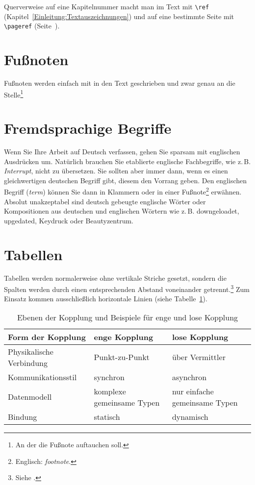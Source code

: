 Querverweise auf eine Kapitelnummer macht man im Text mit \verb+\ref+ (Kapitel~\ref{Einleitung:Textauszeichnungen}) und auf eine bestimmte Seite mit \verb+\pageref+ (Seite~\pageref{Einleitung:Textauszeichnungen}).


\section{Fußnoten}

Fußnoten werden einfach mit in den Text geschrieben und zwar genau an die Stelle\footnote{An der die Fußnote auftauchen soll.}



\section{Fremdsprachige Begriffe}

Wenn Sie Ihre Arbeit auf Deutsch verfassen, gehen Sie sparsam mit englischen Ausdrücken um. Natürlich brauchen Sie etablierte englische Fachbegriffe, wie z.\,B. \textit{Interrupt}, nicht zu übersetzen. Sie sollten aber immer dann, wenn es einen gleichwertigen deutschen Begriff gibt, diesem den Vorrang geben. Den englischen Begriff (\textit{term}) können Sie dann in Klammern oder in einer Fußnote\footnote{Englisch: \textit{footnote}.} erwähnen. Absolut unakzeptabel sind deutsch gebeugte englische Wörter oder Kompositionen aus deutschen und englischen Wörtern wie z.\,B. downgeloadet, upgedated, Keydruck oder Beautyzentrum. 



\section{Tabellen}

Tabellen werden normalerweise ohne vertikale Striche gesetzt, sondern die Spalten werden durch einen entsprechenden Abstand voneinander getrennt.\footnote{Siehe \cite[S. 89]{Willberg1999}.} Zum Einsatz kommen ausschließlich horizontale Linien (siehe Tabelle~\ref{Kap2:Kopplungsformen}).

\begin{table}[h]
  \caption{Ebenen der Kopplung und Beispiele für enge und lose Kopplung}
  \label{Kap2:Kopplungsformen}
  \renewcommand{\arraystretch}{1.2}
  \centering
  \sffamily
  \begin{footnotesize}
    \begin{tabular}{l l l}
    \toprule
    \textbf{Form der Kopplung} & \textbf{enge Kopplung} & \textbf{lose Kopplung}\\
    \midrule
    Physikalische Verbindung	&	Punkt-zu-Punkt	& 	über Vermittler\\
    Kommunikationsstil	&	synchron		&	asynchron\\
    Datenmodell	&	komplexe gemeinsame Typen	&	nur einfache gemeinsame Typen\\
    Bindung	&	statisch		&	dynamisch\\
    \bottomrule
    \end{tabular}
  \end{footnotesize}
  \rmfamily
\end{table}

